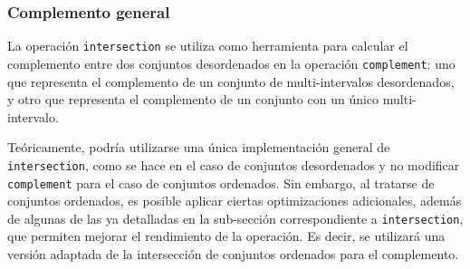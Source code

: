 \begin{center}
\end{center}



\subsubsection{Complemento general}

La operación \texttt{intersection} se utiliza como herramienta para calcular el complemento entre dos conjuntos desordenados en la operación \texttt{complement}: uno que representa el complemento de un conjunto de multi-intervalos desordenados, y otro que representa el complemento de un conjunto con un único multi-intervalo.

Teóricamente, podría utilizarse una única implementación general de \texttt{intersection}, como se hace en el caso de conjuntos desordenados y no modificar \texttt{complement} para el caso de conjuntos ordenados. Sin embargo, al tratarse de conjuntos ordenados, es posible aplicar ciertas optimizaciones adicionales, además de algunas de las ya detalladas en la sub-sección correspondiente a \texttt{intersection}, que permiten mejorar el rendimiento de la operación. Es decir, se utilizará una versión adaptada de la intersección de conjuntos ordenados para el complemento.

